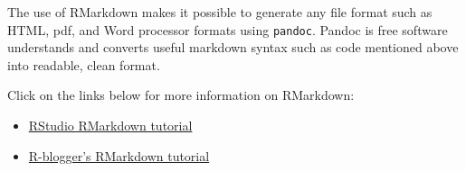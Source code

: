 \documentclass[]{book}
\providecommand{\tightlist}{%
  \setlength{\itemsep}{0pt}\setlength{\parskip}{0pt}}
\theoremstyle{definition}
\theoremstyle{definition}
\theoremstyle{remark}
\begin{document}
The use of RMarkdown makes it possible to generate any file format such
as HTML, pdf, and Word processor formats using \texttt{pandoc}. Pandoc
is free software understands and converts useful markdown syntax such as
code mentioned above into readable, clean format.

Click on the links below for more information on RMarkdown:

\begin{itemize}
\tightlist
\item
  \href{http://rmarkdown.rstudio.com/authoring_quick_tour.html}{RStudio
  RMarkdown tutorial}
\item
  \href{https://www.r-bloggers.com/r-markdown-and-knitr-tutorial-part-1/}{R-blogger's
  RMarkdown tutorial}
\end{itemize}


\end{document}

